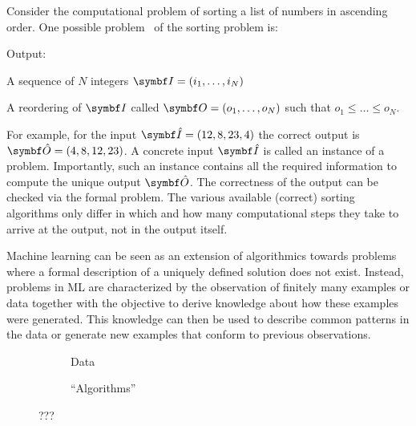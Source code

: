Consider the computational problem of sorting a list of numbers in ascending order.
One possible problem~\parencite{cormen_introduction_2009} of the sorting problem is:
\begin{problem}[Sorting]
\label{prob:bayesian_ml:sorting}
\begin{labeling}{Output:}
    \item[Input:] A sequence of $N$ integers $\mat{I} = (i_1, \dots, i_N)$
    \item[Output:] A reordering of $\mat{I}$ called $\mat{O} = (o_1, \dots, o_N)$ such that $o_1 \leq \dots \leq o_N$.
\end{labeling}
\end{problem}
For example, for the input $\mat{\hat{I}}=(12, 8, 23, 4)$ the correct output is $\mat{\hat{O}}=(4, 8, 12, 23)$.
A concrete input $\mat{\hat{I}}$ is called an instance of a problem.
Importantly, such an instance contains all the required information to compute the unique output $\mat{\hat{O}}$.
The correctness of the output can be checked via the formal problem.
The various available (correct) sorting algorithms only differ in which and how many computational steps they take to arrive at the output, not in the output itself.

Machine learning can be seen as an extension of algorithmics towards problems where a formal description of a uniquely defined solution does not exist.
Instead, problems in ML are characterized by the observation of finitely many examples or data together with the objective to derive knowledge about how these examples were generated.
This knowledge can then be used to describe common patterns in the data or generate new examples that conform to previous observations.

\begin{figure}[t]
    \begin{subfigure}[b]{\halffigurewidth}
        \centering
        \caption{
            Data
            \label{fig:bayesian_ml:polynomials:data}
        }
    \end{subfigure}
    \hfill
    \begin{subfigure}[b]{\halffigurewidth}
        \centering
        \caption{
            \enquote{Algorithms}
            \label{fig:bayesian_ml:polynomials:lagrange}
        }
    \end{subfigure}
    \caption[Algorithmic Interpolation]{
        ???
        \label{fig:bayesian_ml:polynoms}
    }
\end{figure}


